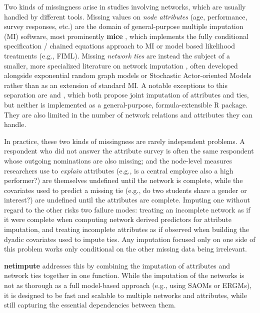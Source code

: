 \documentclass[11pt,a4paper]{article}
\newcommand{\pkg}[1]{\textbf{#1}}
\newcommand{\proglang}[1]{\textsf{#1}}
\begin{document}
Two kinds of missingness arise in studies involving networks, which are
usually
handled by different tools. Missing values on \emph{node attributes}
(age, performance, survey responses, etc.) are the domain of general-purpose
multiple
imputation (MI) software, most prominently \pkg{mice}
\citep{vanBuuren2011}, which implements the fully conditional
specification / chained equations approach to MI
\citep{Rubin1987,LittleRubin2002} or model based likelihood treatments (e.g., FIML). Missing \emph{network ties} are instead the subject of a smaller,
more specialized literature on network imputation
\citep{Huisman2009,Koskinen2010,Krause2018,Krause2020}, often developed
alongside exponential random
graph models \citep{Robins2007} or Stochastic Actor-oriented Models
\citep{Snijders1996,Snijders2017} rather than as an extension of standard MI. A
notable exceptions to this separation are \citet{Koskinen2013} and
\citet{Krause2019}, which both propose joint imputation of attributes and ties,
but neither is implemented as a general-purpose, formula-extensible \proglang{R}
package. They are also limited in the number of network relations and attributes
they can handle.

In practice, these two kinds of missingness are rarely independent
problems. A respondent who did not answer the attribute survey is often the
same respondent whose outgoing nominations are also missing; and the
node-level measures researchers use to \emph{explain} attributes (e.g., is a
central employee also a high performer?) are themselves undefined until the
network is complete, while the covariates used to predict a missing tie
(e.g., do two students share a gender or interest?)
are undefined until the attributes are complete. Imputing one without
regard to the other risks two failure modes: treating an incomplete network
as if it were complete when computing network derived predictors for
attribute imputation, and treating incomplete attributes as if observed when
building the dyadic covariates used to impute ties. Any imputation focused only on one side of this problem works only conditional on the other missing data being irrelevant.

\pkg{netimpute} addresses this by combining the imputation of attributes and network ties together in one function. While the imputation of
the networks is not as thorough as a full model-based approach (e.g., using
SAOMs or ERGMs), it is designed to be fast and scalable to multiple networks and
attributes, while still capturing the essential dependencies between them.
\end{document}

